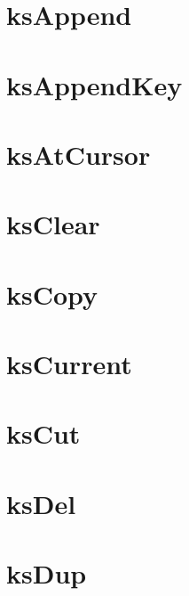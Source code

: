 \documentclass[twoside]{book}
\newcommand{\+}{\discretionary{\mbox{\scriptsize$\hookleftarrow$}}{}{}}
\begin{document}
\chapter{ks\+Append}
\label{doc_api_review_core_ksAppend_md}

\chapter{ks\+Append\+Key}
\label{doc_api_review_core_ksAppendKey_md}

\chapter{ks\+At\+Cursor}
\label{doc_api_review_core_ksAtCursor_md}

\chapter{ks\+Clear}
\label{doc_api_review_core_ksClear_md}

\chapter{ks\+Copy}
\label{doc_api_review_core_ksCopy_md}

\chapter{ks\+Current}
\label{doc_api_review_core_ksCurrent_md}

\chapter{ks\+Cut}
\label{doc_api_review_core_ksCut_md}

\chapter{ks\+Del}
\label{doc_api_review_core_ksDel_md}

\chapter{ks\+Dup}
\label{doc_api_review_core_ksDup_md}

\end{document}
